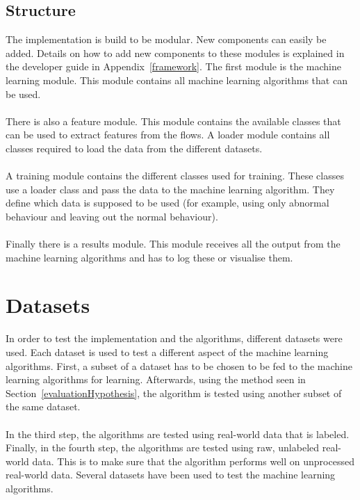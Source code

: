 \subsection{Structure}
\label{modules}
The implementation is build to be modular. New components can easily be added. Details on how to add new components to these modules is explained in the developer guide in Appendix~\ref{framework}. The first module is the machine learning module. This module contains all machine learning algorithms that can be used. \\
\\
There is also a feature module. This module contains the available classes that can be used to extract features from the flows. A loader module contains all classes required to load the data from the different datasets. \\
\\
A training module contains the different classes used for training. These classes use a loader class and pass the data to the machine learning algorithm. They define which data is supposed to be used (for example, using only abnormal behaviour and leaving out the normal behaviour). \\
\\
Finally there is a results module. This module receives all the output from the machine learning algorithms and has to log these or visualise them.

\section{Datasets}
\label{datasets}
In order to test the implementation and the algorithms, different datasets were used. Each dataset is used to test a different aspect of the machine learning algorithms. First, a subset of a dataset has to be chosen to be fed to the machine learning algorithms for learning. Afterwards, using the method seen in Section~\ref{evaluationHypothesis}, the algorithm is tested using another subset of the same dataset. \\\\
In the third step, the algorithms are tested using real-world data that is labeled. Finally, in the fourth step, the algorithms are tested using raw, unlabeled real-world data. This is to make sure that the algorithm performs well on unprocessed real-world data. Several datasets have been used to test the machine learning algorithms.

